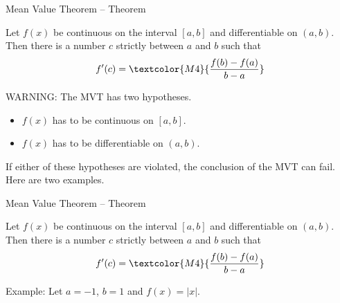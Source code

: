 
\begin{frame}[t]
\begin{block}{Mean Value Theorem -- Theorem~}

Let $f(x)$ be \textcolor{M3}{continuous} on the interval $[a,b]$ and \textcolor{M3}{differentiable} on $(a,b)$. Then there is a number $c$ strictly between $a$ and $b$ such that
\[ f'(c)=\textcolor{M4}{\frac{f(b)-f(a)}{b-a}}\]
\end{block}
\vfill

WARNING: The MVT has two hypotheses.
\begin{itemize}
\item $f(x)$ has to be continuous on $[a,b]$.
\item $f(x)$ has to be differentiable on $(a,b)$.
\end{itemize}
If either of these hypotheses are violated, the conclusion of the MVT can fail.
Here are two  examples.
\end{frame}


\begin{frame}[t]
\begin{block}{Mean Value Theorem -- Theorem~}

Let $f(x)$ be \textcolor{M3}{continuous} on the interval $[a,b]$ and \textcolor{M3}{differentiable} on $(a,b)$. Then there is a number $c$ strictly between $a$ and $b$ such that
\[ f'(c)=\textcolor{M4}{\frac{f(b)-f(a)}{b-a}}\]
\end{block}
\vfill

Example: Let $a=-1$, $b=1$ and $f(x)=|x|$.

\begin{multicols}{2}
\columnbreak\color{answercolor}
\end{multicols}
\end{frame}


